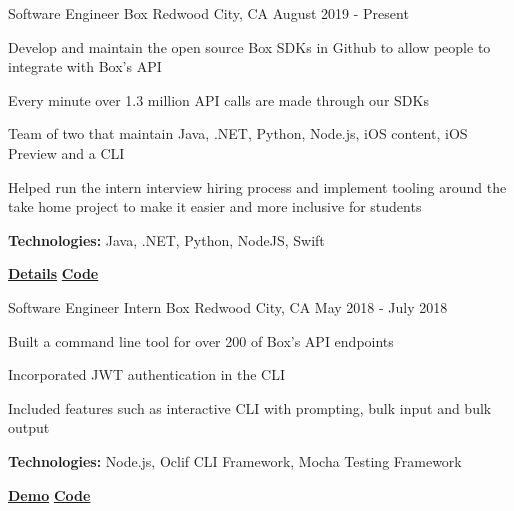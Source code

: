 
\begin{cventries}
  \cventry
    {Software Engineer} %
    {Box} %
    {Redwood City, CA} %
    {August 2019 - Present} %
    {
      \begin{cvitems} %
        \item{Develop and maintain the open source Box SDKs in Github to allow people to integrate with Box's API}
        \item{Every minute over 1.3 million API calls are made through our SDKs}
        \item{Team of two that maintain Java, .NET, Python, Node.js, iOS content, iOS Preview and a CLI}
        \item{Helped run the intern interview hiring process and implement tooling around the take home project to make it easier and more inclusive for students }
        {\setlength \itemindent{-2ex} \itemsep2pt \item[] \textbf{Technologies:} Java, .NET, Python, NodeJS, Swift}
        {\setlength \itemindent{-2ex} \itemsep2pt \item[] 
        \href{https://sujaygarlanka.com/experience.html\#box}{ \faInfoCircle \textbf{ Details}}
        \href{https://github.com/box/sdks}{ \faGithub \textbf{ Code}}}
      \end{cvitems}
    }
    
  \cventry
    {Software Engineer Intern} %
    {Box} %
    {Redwood City, CA} %
    {May 2018 - July 2018} %
    {
      \begin{cvitems} %
        \item{Built a command line tool for over 200 of Box’s API endpoints}
        \item{Incorporated JWT authentication in the CLI}
        \item{Included features such as interactive CLI with prompting, bulk input and bulk output}
        {\setlength \itemindent{-2ex} \itemsep2pt \item[] \textbf{Technologies:} Node.js, Oclif CLI Framework, Mocha Testing Framework}
        {\setlength \itemindent{-2ex} \itemsep2pt \item[]  \href{https://sujaygarlanka.com/experience.html\#internship}{ \faPlayCircle \textbf{ Demo}} \href{https://github.com/box/boxcli}{ \faGithub \textbf{ Code}}}
      \end{cvitems}
    }


\end{cventries}
